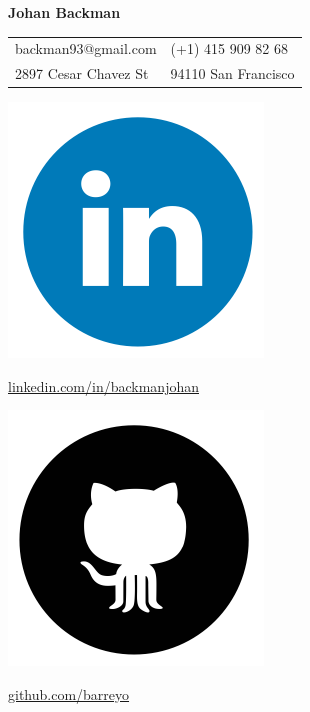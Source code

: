 \documentclass{cv_doc}
\begin{document}
\textbf{{\sffamily\huge Johan Backman}} \\

\begin{tabular}{@{}l l }
 backman93@gmail.com & (+1) 415 909 82 68 \\
 2897 Cesar Chavez St & 94110 San Francisco \\
\end{tabular}

\vspace{0.12cm}

\begin{minipage}[c]{0.03\textwidth}
\includegraphics[scale=0.04]{linkedin}
\end{minipage}
\begin{minipage}[c]{0.25\textwidth}
{\small \href{https://linkedin.com/in/backmanjohan}{linkedin.com/in/backmanjohan}}
\end{minipage}

\begin{minipage}[c]{0.03\textwidth}
\includegraphics[scale=0.04]{github}
\end{minipage}
\begin{minipage}[c]{0.25\textwidth}
{\small \href{https://github.com/barreyo}{github.com/barreyo}}
\end{minipage}
\end{document}
